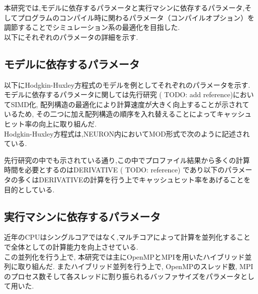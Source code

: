 本研究では,モデルに依存するパラメータと実行マシンに依存するパラメータ,そしてプログラムのコンパイル時に関わるパラメータ（コンパイルオプション）を調節することでシミュレーション系の最適化を目指した.\\
以下にそれぞれのパラメータの詳細を示す.\\
\subsection{モデルに依存するパラメータ}
以下にHodgkin-Huxley方程式のモデルを例としてそれぞれのパラメータを示す.\\
モデルに依存するパラメータに関しては先行研究 ( TODO: add reference)においてSIMD化, 配列構造の最適化により計算速度が大きく向上することが示されているため,
その二つに加え配列構造の順序を入れ替えることによってキャッシュヒット率の向上に取り組んだ.\\
Hodgkin-Huxley方程式は,NEURON内においてMOD形式で次のように記述されている.\\
{\footnotesize

}
先行研究の中でも示されている通り,この中でプロファイル結果から多くの計算時間を必要とするのはDERIVATIVE ( TODO: reference)
であり以下のパラメータの多くはDERIVATIVEの計算を行う上でキャッシュヒット率をあげることを目的としている.\\




\subsection{実行マシンに依存するパラメータ}
近年のCPUはシングルコアではなく,マルチコアによって計算を並列化することで全体としての計算能力を向上させている.\\
この並列化を行う上で, 本研究では主にOpenMPとMPIを用いたハイブリッド並列に取り組んだ. またハイブリッド並列を行う上で,
OpenMPのスレッド数, MPIのプロセス数そして各スレッドに割り振られるバッファサイズをパラメータとして用いた.\\






